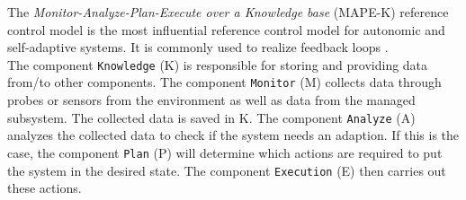 The \textit{Monitor-Analyze-Plan-Execute over a Knowledge base} (MAPE-K) \cite{autonomic-computing} reference control model is the most influential reference control model for autonomic and self-adaptive systems. It is commonly used to realize feedback loops \cite{mape-k}.\\

The component \texttt{Knowledge} (K) is responsible for storing and providing data from/to other components. The component \texttt{Monitor} (M) collects data through probes or sensors from the environment as well as data from the managed subsystem. The collected data is saved in K. The component \texttt{Analyze} (A) analyzes the collected data to check if the system needs an adaption. If this is the case, the component \texttt{Plan} (P) will determine which actions are required to put the system in the desired state. The component \texttt{Execution} (E) then carries out these actions. \cite{mape-k}  